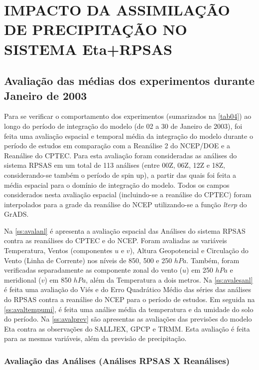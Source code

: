 \hypertarget{estilo:capitulo}{}
\chapter{IMPACTO DA ASSIMILAÇÃO DE PRECIPITAÇÃO NO SISTEMA Eta+RPSAS}
\label{ss:cap3}

\section{Avaliação das médias dos experimentos durante Janeiro de 2003}
\label{ss:avalmedia}

Para se verificar o comportamento dos experimentos (sumarizados na \autoref{tab04}) ao longo do período de integração do modelo (de 02 a 30 de Janeiro de 2003), foi feita uma avaliação espacial e temporal média da integração do modelo durante o período de estudos em comparação com a Reanálise 2 do NCEP/DOE e a Reanálise do CPTEC. Para esta avaliação foram consideradas as análises do sistema RPSAS em um total de 113 análises (entre 00Z, 06Z, 12Z e 18Z, considerando-se também  o período de spin up), a partir das quais foi feita a média espacial para o domínio de integração do modelo. Todos os campos considerados nesta avaliação espacial (incluindo-se a reanálise do CPTEC) foram interpolados para a grade da reanálise do NCEP utilizando-se a função \textit{lterp} do GrADS. 

Na \autoref{ss:avalanl} é apresenta a avaliação espacial das Análises do sistema RPSAS contra as reanálises do CPTEC e do NCEP. Foram avaliadas as variáveis Temperatura, Ventos (componentes $u$ e $v$), Altura Geopotencial e Circulação do Vento (Linha de Corrente) nos níveis de 850, 500 e 250 $hPa$. Também, foram verificadas separadamente as componente zonal do vento ($u$) em 250 $hPa$ e meridional ($v$) em 850 $hPa$, além da Temperatura a dois metros. Na \autoref{ss:avalesanl} é feita uma avaliação do Viés e do Erro Quadrático Médio das séries das análises do RPSAS contra a reanálise do NCEP para o período de estudos. Em seguida na \autoref{ss:avaltempumi}, é feita uma análise média da temperatura e da umidade do solo do período. Na \autoref{ss:avalprev} são apresentas as avaliações das previsões do modelo Eta contra as observações do SALLJEX, GPCP e TRMM. Esta avaliação é feita para as mesmas variáveis, além da previsão de precipitação.

\subsection{Avaliação das Análises (Análises RPSAS X Reanálises)}
\label{ss:avalanl}

